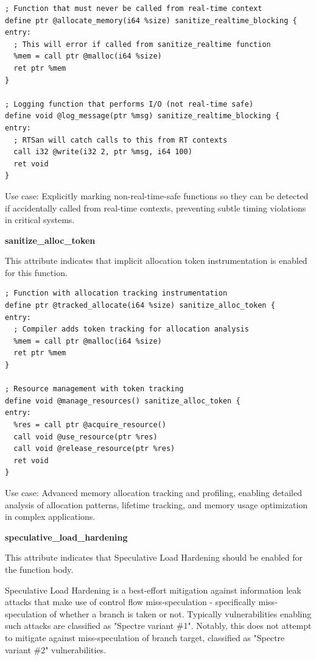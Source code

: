 \begin{lstlisting}[style=ir]
; Function that must never be called from real-time context
define ptr @allocate_memory(i64 %size) sanitize_realtime_blocking {
entry:
  ; This will error if called from sanitize_realtime function
  %mem = call ptr @malloc(i64 %size)
  ret ptr %mem
}

; Logging function that performs I/O (not real-time safe)
define void @log_message(ptr %msg) sanitize_realtime_blocking {
entry:
  ; RTSan will catch calls to this from RT contexts
  call i32 @write(i32 2, ptr %msg, i64 100)
  ret void
}
\end{lstlisting}

Use case: Explicitly marking non-real-time-safe functions so they can be detected if accidentally called from real-time contexts, preventing subtle timing violations in critical systems.

\textbf{sanitize\_alloc\_token}

This attribute indicates that implicit allocation token instrumentation is enabled for this function.

\begin{lstlisting}[style=ir]
; Function with allocation tracking instrumentation
define ptr @tracked_allocate(i64 %size) sanitize_alloc_token {
entry:
  ; Compiler adds token tracking for allocation analysis
  %mem = call ptr @malloc(i64 %size)
  ret ptr %mem
}

; Resource management with token tracking
define void @manage_resources() sanitize_alloc_token {
entry:
  %res = call ptr @acquire_resource()
  call void @use_resource(ptr %res)
  call void @release_resource(ptr %res)
  ret void
}
\end{lstlisting}

Use case: Advanced memory allocation tracking and profiling, enabling detailed analysis of allocation patterns, lifetime tracking, and memory usage optimization in complex applications.

\textbf{speculative\_load\_hardening}

This attribute indicates that Speculative Load Hardening should be enabled for the function body.

Speculative Load Hardening is a best-effort mitigation against information leak attacks that make use of control flow miss-speculation - specifically miss-speculation of whether a branch is taken or not.
Typically vulnerabilities enabling such attacks are classified as "Spectre variant \#1".
Notably, this does not attempt to mitigate against miss-speculation of branch target, classified as "Spectre variant \#2" vulnerabilities.

